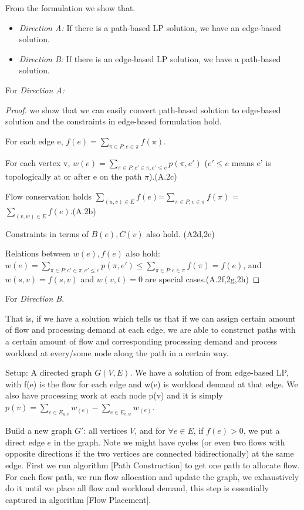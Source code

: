 From the formulation we show that.
\begin{itemize}
  \item {\emph{Direction A:} If there is a path-based LP solution, we have an edge-based solution.}
  \item {\emph{Direction B:} If there is an edge-based LP solution, we have a path-based solution.}
\end{itemize}

For \emph{Direction A:}
\begin{proof}
we show that we can easily convert path-based solution to edge-based solution and the constraints in edge-based formulation hold.

For each edge e, $f(e) =\sum\limits_{\pi\in P: e\in \pi} f(\pi)$.

For each vertex v, $w(e) = \sum\limits_{\pi\in P: e'\in \pi, e' \leq e} p(\pi, e')$ ($e'\leq e$ means e' is topologically at or after e on the path $\pi$).(A.2c)

Flow conservation holds $ \sum\limits_{(u,v)\in E} f(e) $=$ \sum\limits_{\pi\in P, v\in \pi} f(\pi)$ = $\sum\limits_{(v,w )\in E} f(e)$.(A.2b)

Constraints in terms of $B(e), C(v)$ also hold. (A2d,2e)

Relations between $w(e), f(e)$ also hold: $w(e)= \sum\limits_{\pi\in P: e'\in \pi, e' \leq e} p(\pi, e')\leq \sum\limits_{\pi\in P: e\in \pi} f(\pi) = f(e) $, and $w(s,v)=f(s,v)$ and $w(v,t)=0$ are special cases.(A.2f,2g,2h)

\end{proof}

For {\emph{Direction B}}.

That is, if we have a solution which tells us that if we can assign certain amount of flow and processing 
demand at each edge, we are able to construct paths with a certain amount of flow 
and corresponding processing demand and process workload at every/some node along the path in a certain way.

Setup:
A directed graph $G(V,E)$. We have a solution of from edge-based LP, with 
f(e) is the flow for each edge and w(e) is workload demand at that edge. We also have processing work at each node p(v) and it is simply $p(v) = 
\sum\limits_{e \in E_{u, v} }w_(e) - \sum\limits_{e \in E_{v, w} }w_(e)  $.

Build a new graph $G'$: all vertices $V$, and for $\forall e\in E $, if $f(e) >0$, we put a direct edge $e$ in the graph. Note we might have cycles (or even two flows with opposite directions if the two vertices are connected bidirectionally) at the same edge. First we run algorithm [Path Construction] to get one path to allocate flow. For each flow path, we run flow allocation and update the graph, we exhaustively do it until we place all flow and workload demand, this step is essentially captured in algorithm [Flow Placement]. 

